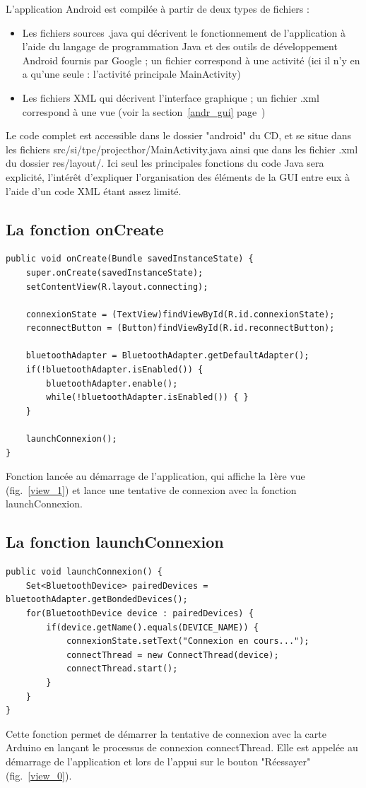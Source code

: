 L'application Android est compilée à partir de deux types de fichiers :
\begin{itemize}
	\item Les fichiers sources .java qui décrivent le fonctionnement de l'application à l'aide du langage de programmation Java et des outils de développement Android fournis par Google ; un fichier correspond à une activité (ici il n'y en a qu'une seule : l'activité principale MainActivity)
	\item Les fichiers XML qui décrivent l'interface graphique ; un fichier .xml correspond à une vue (voir la section~\ref{andr_gui} page~\pageref{andr_gui})
\end{itemize}
Le code complet est accessible dans le dossier "android" du CD, et se situe dans les fichiers src/si/tpe/projecthor/MainActivity.java ainsi que dans les fichier .xml du dossier res/layout/.
Ici seul les principales fonctions du code Java sera explicité, l'intérêt d'expliquer l'organisation des éléments de la GUI entre eux à l'aide d'un code XML étant assez limité.

\lstset{language=Java}

\subsection{La fonction onCreate}

\begin{lstlisting}
public void onCreate(Bundle savedInstanceState) {
	super.onCreate(savedInstanceState);
	setContentView(R.layout.connecting);
	
	connexionState = (TextView)findViewById(R.id.connexionState);
	reconnectButton = (Button)findViewById(R.id.reconnectButton);

	bluetoothAdapter = BluetoothAdapter.getDefaultAdapter();
	if(!bluetoothAdapter.isEnabled()) {
		bluetoothAdapter.enable();
		while(!bluetoothAdapter.isEnabled()) { }
	}

	launchConnexion();
}
\end{lstlisting}
Fonction lancée au démarrage de l'application, qui affiche la 1ère vue (fig.~\ref{view_1}) et lance une tentative de connexion avec la fonction launchConnexion. \\

\subsection{La fonction launchConnexion}

\begin{lstlisting}
public void launchConnexion() {
	Set<BluetoothDevice> pairedDevices = bluetoothAdapter.getBondedDevices();
	for(BluetoothDevice device : pairedDevices) {
		if(device.getName().equals(DEVICE_NAME)) {
			connexionState.setText("Connexion en cours...");
			connectThread = new ConnectThread(device);
			connectThread.start();
		}
	}
}
\end{lstlisting}
Cette fonction permet de démarrer la tentative de connexion avec la carte Arduino en lançant le processus de connexion connectThread. Elle est appelée au démarrage de l'application et lors de l'appui sur le bouton "Réessayer" (fig.~\ref{view_0}). \\

